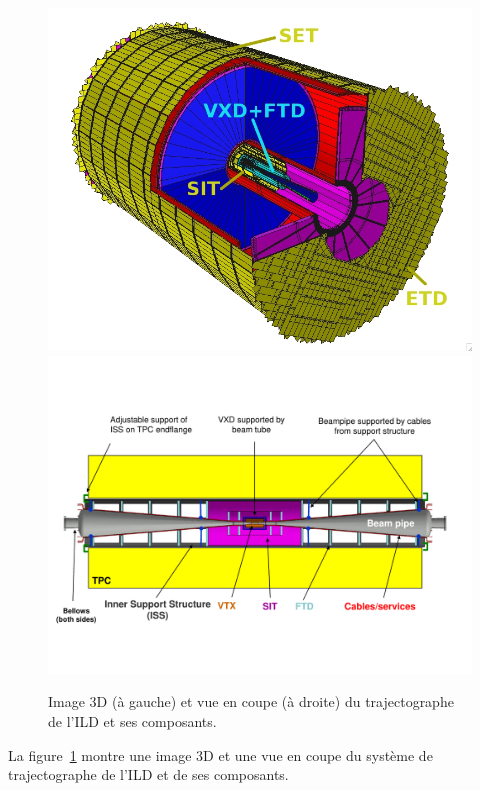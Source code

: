 \begin{figure}[!ht]
  \begin{center}
    \includegraphics[width=.43\textwidth]{ILC/figs/Image_7b.jpg}
    \includegraphics[width=.55\textwidth]{ILC/figs/ILd_inner.pdf}
    \caption{Image 3D (à gauche) et vue en coupe (à droite) du trajectographe de l'ILD et ses composants.}
    \label{fig:ild-traj}
  \end{center}
\end{figure}
La figure~\ref{fig:ild-traj} montre une image 3D et une vue en coupe du système de trajectographe de l'ILD et de ses composants.
\newpage
